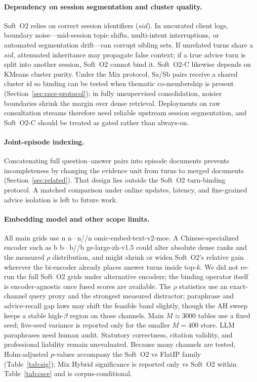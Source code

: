 \documentclass[preprint,12pt,authoryear]{elsarticle}
\DeclareRobustCommand{\modelid}[1]{{\ttfamily\modelidbreak#1\relax}}
\def\modelidbreak#1{%
  \ifx#1\relax\else
    \ifx#1--\hspace{0pt}\else
    \ifx#1//\hspace{0pt}\else#1\fi\fi
    \expandafter\modelidbreak
  \fi}
\begin{document}
\paragraph{Dependency on session segmentation and cluster quality.}
Soft~O2 relies on correct session identifiers ($sid$).
In uncurated client logs, boundary noise---mid-session topic shifts, multi-intent interruptions, or automated segmentation drift---can corrupt sibling sets.
If unrelated turns share a $sid$, attenuated inheritance may propagate false context; if a true advice turn is split into another session, Soft~O2 cannot bind it.
Soft~O2-C likewise depends on KMeans cluster purity.
Under the Mix protocol, Sa/Sb pairs receive a shared cluster id so binding can be tested when thematic co-membership is present (Section~\ref{sec:csce-protocol}); in fully unsupervised consolidation, noisier boundaries shrink the margin over dense retrieval.
Deployments on raw consultation streams therefore need reliable upstream session segmentation, and Soft~O2-C should be treated as gated rather than always-on.

\paragraph{Joint-episode indexing.}
Concatenating full question--answer pairs into episode documents prevents incompleteness by changing the evidence unit from turns to merged documents (Section~\ref{sec:related}).
That design lies outside the Soft~O2 turn-binding protocol.
A matched comparison under online updates, latency, and fine-grained advice isolation is left to future work.

\paragraph{Embedding model and other scope limits.}
All main grids use \modelid{nomic-embed-text-v2-moe}.
A Chinese-specialized encoder such as \modelid{bge-large-zh-v1.5} could alter absolute dense ranks and the measured $\rho$ distribution, and might shrink or widen Soft~O2's relative gain wherever the bi-encoder already places answer turns inside top-$k$.
We did not re-run the full Soft~O2 grids under alternative encoders; the binding operator itself is encoder-agnostic once fused scores are available.
The $\rho$ statistics use an exact-channel query proxy and the strongest measured distractor; paraphrase and advice-recall gap laws may shift the feasible band slightly, though the AH sweep keeps a stable high-$\beta$ region on those channels.
Main $M{\approx}3000$ tables use a fixed seed; five-seed variance is reported only for the smaller $M{=}400$ store.
LLM paraphrases need human audit.
Statutory correctness, citation validity, and professional liability remain unevaluated.
Because many channels are tested, Holm-adjusted $p$-values accompany the Soft~O2 vs FlatIP family (Table~\ref{tab:sig}); Mix Hybrid significance is reported only vs Soft~O2 within Table~\ref{tab:csce} and is corpus-conditional.
\end{document}
